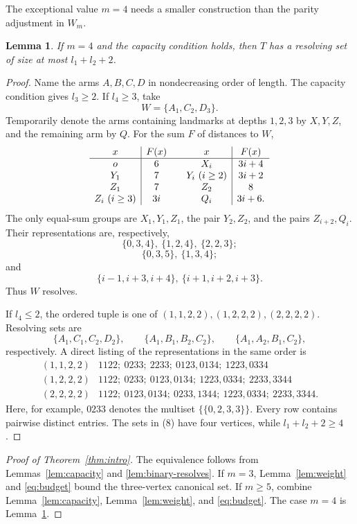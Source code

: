 \documentclass[11pt]{amsart}
\newtheorem{lemma}[theorem]{Lemma}
\theoremstyle{definition}
\begin{document}
The exceptional value \(m=4\) needs a smaller construction than the parity
adjustment in \(W_m\).

\begin{lemma}\label{lem:four}
If \(m=4\) and the capacity condition holds, then \(T\) has a resolving set of
size at most \(l_1+l_2+2\).
\end{lemma}

\begin{proof}
Name the arms \(A,B,C,D\) in nondecreasing order of length.  The capacity
condition gives \(l_3\ge2\).  If \(l_4\ge3\), take
\[
 W=\{A_1,C_2,D_3\}.
\]
Temporarily denote the arms containing landmarks at depths \(1,2,3\) by
\(X,Y,Z\), and the remaining arm by \(Q\).  For the sum \(F\) of distances to
\(W\),
\[
\begin{array}{c|c@{\qquad}c|c}
x&F(x)&x&F(x)\\ \hline
o&6&X_i&3i+4\\
Y_1&7&Y_i\ (i\ge2)&3i+2\\
Z_1&7&Z_2&8\\
Z_i\ (i\ge3)&3i&Q_i&3i+6.
\end{array}
\]
The only equal-sum groups are \(X_1,Y_1,Z_1\), the pair \(Y_2,Z_2\), and the
pairs \(Z_{i+2},Q_i\).  Their representations are, respectively,
\[
 \{0,3,4\},\ \{1,2,4\},\ \{2,2,3\};
\]
\[
 \{0,3,5\},\ \{1,3,4\};
\]
and
\[
 \{i-1,i+3,i+4\},\ \{i+1,i+2,i+3\}.
\]
Thus \(W\) resolves.

If \(l_4\le2\), the ordered tuple is one of
\((1,1,2,2),(1,2,2,2),(2,2,2,2)\).  Resolving sets are
\[
 \{A_1,C_1,C_2,D_2\},\qquad
 \{A_1,B_1,B_2,C_2\},\qquad
 \{A_1,A_2,B_1,C_2\},                                    \tag{8}
\]
respectively.  A direct listing of the representations in the same order is
\[
\begin{array}{c|l}
(1,1,2,2)&
1122;\ 0233;\ 2233;\ 0123,0134;\ 1223,0334\\
(1,2,2,2)&
1122;\ 0233;\ 0123,0134;\ 1223,0334;\ 2233,3344\\
(2,2,2,2)&
1122;\ 0123,0134;\ 0233,1344;\ 1223,0334;\ 2233,3344.
\end{array}
\]
Here, for example, \(0233\) denotes the multiset
\(\{\!\{0,2,3,3\}\!\}\).  Every row contains pairwise distinct entries.
The sets in (8) have four vertices, while \(l_1+l_2+2\ge4\).
\end{proof}

\begin{proof}[Proof of Theorem~\ref{thm:intro}]
The equivalence follows from Lemmas~\ref{lem:capacity} and
\ref{lem:binary-resolves}.  If \(m=3\), Lemma~\ref{lem:weight} and
\eqref{eq:budget} bound the three-vertex canonical set.  If \(m\ge5\), combine
Lemma~\ref{lem:capacity}, Lemma~\ref{lem:weight}, and \eqref{eq:budget}.  The
case \(m=4\) is Lemma~\ref{lem:four}.
\end{proof}
\end{document}
